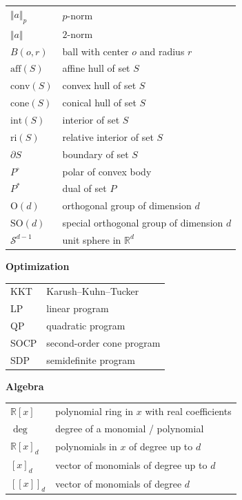\documentclass[
]{book}
\theoremstyle{definition}
\theoremstyle{definition}
\theoremstyle{definition}
\theoremstyle{definition}
\theoremstyle{remark}
\begin{document}
\begin{longtable}[]{@{}ll@{}}
\toprule\noalign{}
\endhead
\bottomrule\noalign{}
\endlastfoot
\(\Vert a \Vert_{p}\) & \(p\)-norm \\
\(\Vert a \Vert\) & \(2\)-norm \\
\(B(o,r)\) & ball with center \(o\) and radius \(r\) \\
\(\mathrm{aff}(S)\) & affine hull of set \(S\) \\
\(\mathrm{conv}(S)\) & convex hull of set \(S\) \\
\(\mathrm{cone}(S)\) & conical hull of set \(S\) \\
\(\mathrm{int}(S)\) & interior of set \(S\) \\
\(\mathrm{ri}(S)\) & relative interior of set \(S\) \\
\(\partial S\) & boundary of set \(S\) \\
\(P^\circ\) & polar of convex body \\
\(P^{*}\) & dual of set \(P\) \\
\(\mathrm{O}(d)\) & orthogonal group of dimension \(d\) \\
\(\mathrm{SO}(d)\) & special orthogonal group of dimension \(d\) \\
\(\mathcal{S}^{d-1}\) & unit sphere in \(\mathbb{R}^{d}\) \\
\end{longtable}

\textbf{Optimization}

\begin{longtable}[]{@{}ll@{}}
\toprule\noalign{}
\endhead
\bottomrule\noalign{}
\endlastfoot
KKT & Karush--Kuhn--Tucker \\
LP & linear program \\
QP & quadratic program \\
SOCP & second-order cone program \\
SDP & semidefinite program \\
\end{longtable}

\textbf{Algebra}

\begin{longtable}[]{@{}ll@{}}
\toprule\noalign{}
\endhead
\bottomrule\noalign{}
\endlastfoot
\(\mathbb{R}[x]\) & polynomial ring in \(x\) with real coefficients \\
\(\deg\) & degree of a monomial / polynomial \\
\(\mathbb{R}[x]_d\) & polynomials in \(x\) of degree up to \(d\) \\
\([x]_d\) & vector of monomials of degree up to \(d\) \\
\([\![x ]\!]_d\) & vector of monomials of degree \(d\) \\
\end{longtable}
\end{document}
